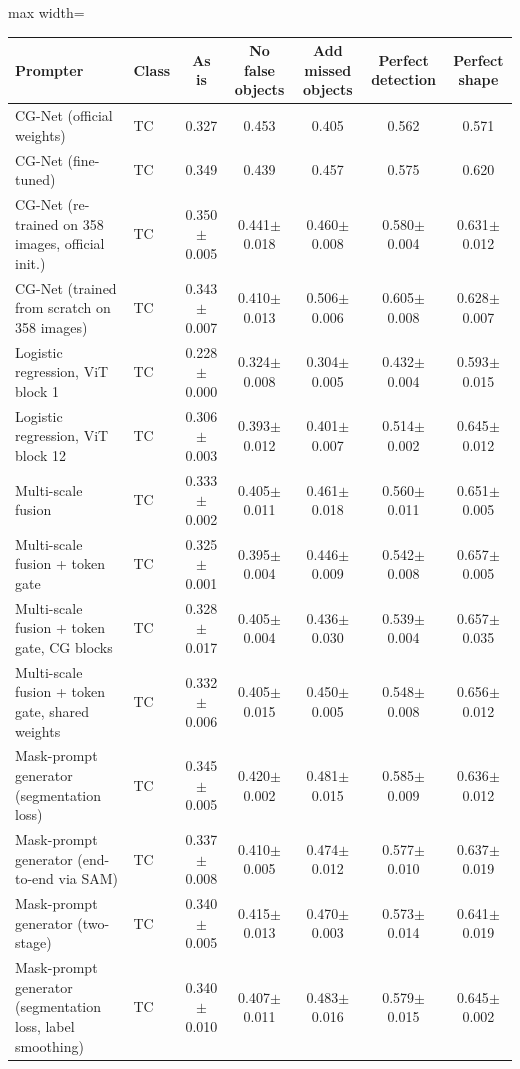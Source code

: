 \begin{table}[htbp]
\centering
\small
\begin{adjustbox}{max width=\linewidth}
\begin{tabular}{llccccc}
\toprule
Prompter & Class & As is & No false objects & Add missed objects & Perfect detection & Perfect shape \\
\midrule
CG-Net (official weights) & TC & 0.327 & 0.453 & 0.405 & 0.562 & 0.571 \\
CG-Net (fine-tuned) & TC & 0.349 & 0.439 & 0.457 & 0.575 & 0.620 \\
CG-Net (re-trained on 358 images, official init.) & TC & 0.350$\pm$0.005 & 0.441$\pm$0.018 & 0.460$\pm$0.008 & 0.580$\pm$0.004 & 0.631$\pm$0.012 \\
CG-Net (trained from scratch on 358 images) & TC & 0.343$\pm$0.007 & 0.410$\pm$0.013 & 0.506$\pm$0.006 & 0.605$\pm$0.008 & 0.628$\pm$0.007 \\
Logistic regression, ViT block 1 & TC & 0.228$\pm$0.000 & 0.324$\pm$0.008 & 0.304$\pm$0.005 & 0.432$\pm$0.004 & 0.593$\pm$0.015 \\
Logistic regression, ViT block 12 & TC & 0.306$\pm$0.003 & 0.393$\pm$0.012 & 0.401$\pm$0.007 & 0.514$\pm$0.002 & 0.645$\pm$0.012 \\
Multi-scale fusion & TC & 0.333$\pm$0.002 & 0.405$\pm$0.011 & 0.461$\pm$0.018 & 0.560$\pm$0.011 & 0.651$\pm$0.005 \\
Multi-scale fusion + token gate & TC & 0.325$\pm$0.001 & 0.395$\pm$0.004 & 0.446$\pm$0.009 & 0.542$\pm$0.008 & 0.657$\pm$0.005 \\
Multi-scale fusion + token gate, CG blocks & TC & 0.328$\pm$0.017 & 0.405$\pm$0.004 & 0.436$\pm$0.030 & 0.539$\pm$0.004 & 0.657$\pm$0.035 \\
Multi-scale fusion + token gate, shared weights & TC & 0.332$\pm$0.006 & 0.405$\pm$0.015 & 0.450$\pm$0.005 & 0.548$\pm$0.008 & 0.656$\pm$0.012 \\
Mask-prompt generator (segmentation loss) & TC & 0.345$\pm$0.005 & 0.420$\pm$0.002 & 0.481$\pm$0.015 & 0.585$\pm$0.009 & 0.636$\pm$0.012 \\
Mask-prompt generator (end-to-end via SAM) & TC & 0.337$\pm$0.008 & 0.410$\pm$0.005 & 0.474$\pm$0.012 & 0.577$\pm$0.010 & 0.637$\pm$0.019 \\
Mask-prompt generator (two-stage) & TC & 0.340$\pm$0.005 & 0.415$\pm$0.013 & 0.470$\pm$0.003 & 0.573$\pm$0.014 & 0.641$\pm$0.019 \\
Mask-prompt generator (segmentation loss, label smoothing) & TC & 0.340$\pm$0.010 & 0.407$\pm$0.011 & 0.483$\pm$0.016 & 0.579$\pm$0.015 & 0.645$\pm$0.002 \\

\end{tabular}
\end{adjustbox}
\end{table}
